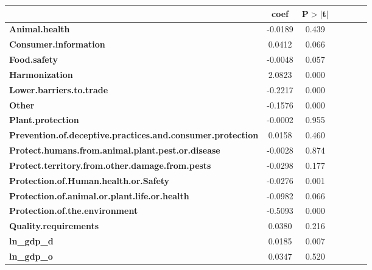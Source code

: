 \begin{table}[ht]
    
    \begin{center}
        \begin{tabular}{lcccccc}
            & \textbf{coef} & \textbf{P$> |$t$|$}\\
            \midrule
\textbf{Animal.health}                                             &      -0.0189  &         0.439   \\
\textbf{Consumer.information}                                      &       0.0412  &         0.066   \\
\textbf{Food.safety}                                               &      -0.0048  &         0.057   \\
\textbf{Harmonization}                                             &       2.0823  &         0.000   \\
\textbf{Lower.barriers.to.trade}                                   &      -0.2217  &         0.000   \\
\textbf{Other}                                                     &      -0.1576  &         0.000   \\
\textbf{Plant.protection}                                          &      -0.0002  &         0.955   \\
\textbf{Prevention.of.deceptive.practices.and.consumer.protection} &       0.0158  &         0.460   \\
\textbf{Protect.humans.from.animal.plant.pest.or.disease}          &      -0.0028  &         0.874   \\
\textbf{Protect.territory.from.other.damage.from.pests}            &      -0.0298  &         0.177   \\
\textbf{Protection.of.Human.health.or.Safety}                      &      -0.0276  &         0.001   \\
\textbf{Protection.of.animal.or.plant.life.or.health}              &      -0.0982  &         0.066   \\
\textbf{Protection.of.the.environment}                             &      -0.5093  &         0.000   \\
\textbf{Quality.requirements}                                      &       0.0380  &         0.216   \\
\textbf{ln\_gdp\_d}                                                &       0.0185  &         0.007   \\
\textbf{ln\_gdp\_o}                                                &       0.0347  &         0.520   \\

\end{tabular}
\end{center}
\end{table}
